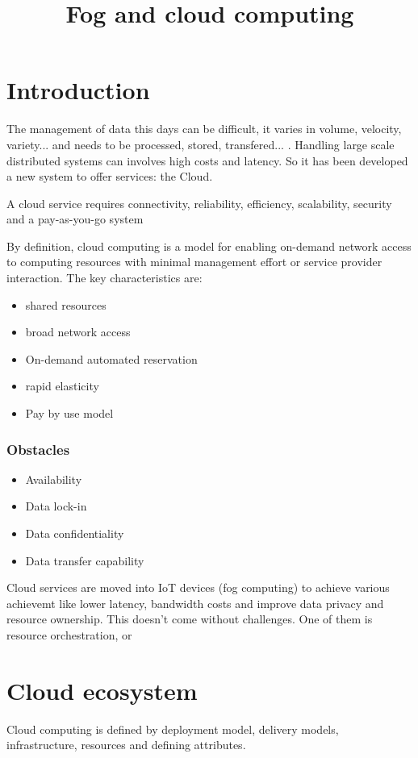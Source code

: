 \documentclass[12pt, a4paper]{article}
\title{Fog and cloud computing}
\begin{document}
\section{Introduction}

The management of data this days can be difficult, it varies in volume, velocity, variety... and needs to be
processed, stored, transfered... . Handling large scale distributed systems can involves high costs and latency.
So it has been developed a new system to offer services: the Cloud.

A cloud service requires connectivity, reliability, efficiency, scalability, security and a pay-as-you-go system

By definition, cloud computing is a model for enabling on-demand network access to computing resources with 
minimal management effort or service provider interaction. The key characteristics are:
\begin{itemize}
    \item shared resources
    \item broad network access
    \item On-demand automated reservation
    \item rapid elasticity
    \item Pay by use model
\end{itemize}

\subsubsection{Obstacles}
\begin{itemize}
    \item Availability
    \item Data lock-in
    \item Data confidentiality
    \item Data transfer capability
\end{itemize}


Cloud services are moved into IoT devices (fog computing) to achieve various achievemt like lower latency, 
bandwidth costs and improve data privacy and resource ownership. This doesn't come without challenges. One 
of them is resource orchestration, or 

\section{Cloud ecosystem}
Cloud computing is defined by deployment model, delivery models, infrastructure, resources and defining 
attributes.
\end{document}

